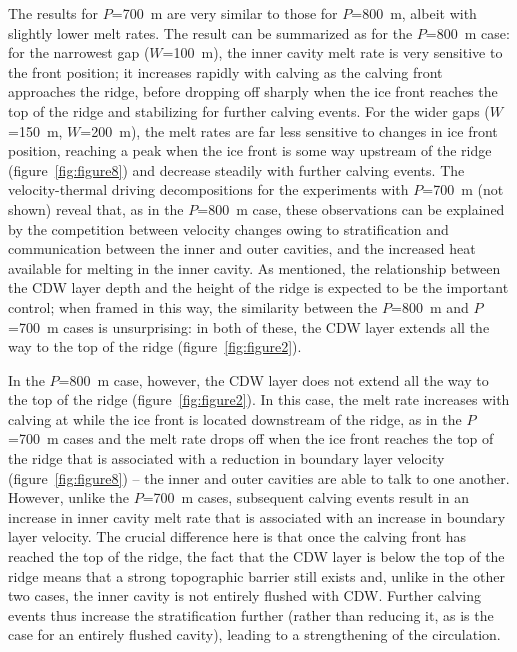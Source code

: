 \documentclass[draft]{agujournal2019}
\begin{document}
The results for $P$=700~m are very similar to those for $P$=800~m, albeit with slightly lower melt rates. The result can be summarized as for the $P$=800~m case: for the narrowest gap ($W$=100~m), the inner cavity melt rate is very sensitive to the front position; it increases rapidly with calving as the calving front approaches the ridge, before dropping off sharply when the ice front reaches the top of the ridge and stabilizing for further calving events. For the wider gaps ($W$=150~m, $W$=200~m), the melt rates are far less sensitive to changes in ice front position, reaching a peak when the ice front is some way upstream of the ridge (figure~\ref{fig:figure8}) and decrease steadily with further calving events. The velocity-thermal driving decompositions for the experiments with $P$=700~m (not shown) reveal that, as in the $P$=800~m case, these observations can be explained by the competition between velocity changes owing to stratification and communication between the inner and outer cavities, and the increased heat available for melting in the inner cavity. As mentioned, the relationship between the CDW layer depth and the height of the ridge is expected to be the important control; when framed in this way, the similarity between the $P$=800~m and $P$=700~m cases is unsurprising: in both of these, the CDW layer extends all the way to the top of the ridge (figure~\ref{fig:figure2}).

In the $P$=800~m case, however, the CDW layer does not extend all the way to the top of the ridge (figure~\ref{fig:figure2}). In this case, the melt rate increases with calving at while the ice front is located downstream of the ridge, as in the $P$=700~m cases and the melt rate drops off when the ice front reaches the top of the ridge that is associated with a reduction in boundary layer velocity (figure~\ref{fig:figure8}) -- the inner and outer cavities are able to talk to one another. However, unlike the $P$=700~m cases, subsequent calving events result in an increase in inner cavity melt rate that is associated with an increase in boundary layer velocity. The crucial difference here is that once the calving front has reached the top of the ridge, the fact that the CDW layer is below the top of the ridge means that a strong topographic barrier still exists and, unlike in the other two cases, the inner cavity is not entirely flushed with CDW. Further calving events thus increase the stratification further (rather than reducing it, as is the case for an entirely flushed cavity), leading to a strengthening of the circulation. 
\end{document}
